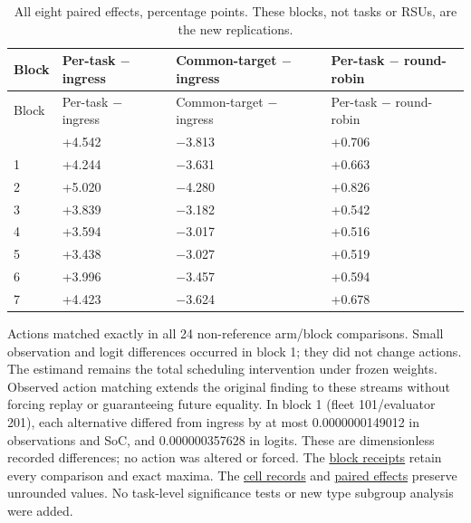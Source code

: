 \documentclass[12pt,a4paper]{article}
\begin{document}
\begingroup
\singlespacing\footnotesize\setlength{\tabcolsep}{3pt}
\begin{xltabular}{\textwidth}{@{}YYYY@{}}
\caption[Eight paired effects]{All eight paired effects, percentage points. These blocks, not tasks or RSUs, are the new replications.}\label{tab:E2} \\
\toprule
Block & Per-task \ensuremath{-} ingress & Common-target \ensuremath{-} ingress & Per-task \ensuremath{-} round-robin \\
\midrule\endfirsthead
\toprule
Block & Per-task \ensuremath{-} ingress & Common-target \ensuremath{-} ingress & Per-task \ensuremath{-} round-robin \\
\midrule\endhead
\bottomrule{} & +4.542 & \ensuremath{-}3.813 & +0.706 \\
1 & +4.244 & \ensuremath{-}3.631 & +0.663 \\
2 & +5.020 & \ensuremath{-}4.280 & +0.826 \\
3 & +3.839 & \ensuremath{-}3.182 & +0.542 \\
4 & +3.594 & \ensuremath{-}3.017 & +0.516 \\
5 & +3.438 & \ensuremath{-}3.027 & +0.519 \\
6 & +3.996 & \ensuremath{-}3.457 & +0.594 \\
7 & +4.423 & \ensuremath{-}3.624 & +0.678 \\
\end{xltabular}
\endgroup

Actions matched exactly in all 24 non-reference arm/block comparisons. Small observation and logit differences occurred in block 1; they did not change actions. The estimand remains the total scheduling intervention under frozen weights. Observed action matching extends the original finding to these streams without forcing replay or guaranteeing future equality. In block 1 (fleet 101/evaluator 201), each alternative differed from ingress by at most 0.0000000149012 in observations and SoC, and 0.000000357628 in logits. These are dimensionless recorded differences; no action was altered or forced. The \href{\detokenize{../joint_confirmation_2026-09-08/evidence/BLOCK_CONTROLS.json}}{block receipts} retain every comparison and exact maxima. The \href{\detokenize{../joint_confirmation_2026-09-08/evidence/CELL_RESULTS.json}}{cell records} and \href{\detokenize{../joint_confirmation_2026-09-08/evidence/PAIRED_EFFECTS.csv}}{paired effects} preserve unrounded values. No task-level significance tests or new type subgroup analysis were added.
\end{document}
